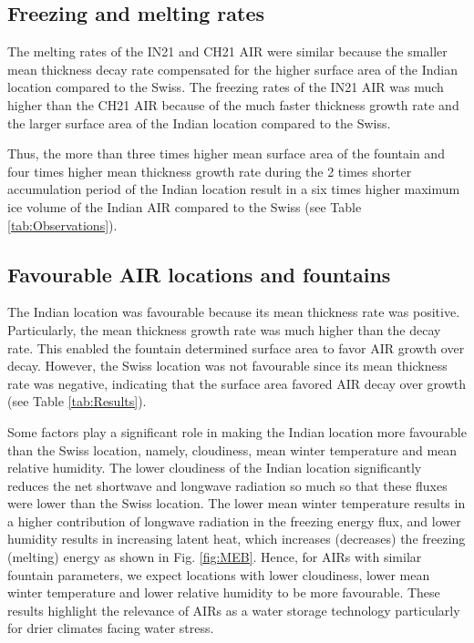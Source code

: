 \documentclass[utf8]{frontiersSCNS}
\begin{document}
\subsection{Freezing and melting rates}

The melting rates of the IN21 and CH21 AIR were similar because the smaller mean thickness decay rate
compensated for the higher surface area of the Indian location compared to the Swiss. The freezing rates of the
IN21 AIR was much higher than the CH21 AIR because of the much faster thickness growth rate and the larger
surface area of the Indian location compared to the Swiss.

Thus, the more than three times higher mean surface area of the fountain and four times higher mean thickness
growth rate during the 2 times shorter accumulation period of the Indian location result in a six times
higher maximum ice volume of the Indian AIR compared to the Swiss (see Table \ref{tab:Observations}).

\subsection{Favourable AIR locations and fountains}

The Indian location was favourable because its mean thickness rate was positive. Particularly, the mean
thickness growth rate was much higher than the decay rate. This enabled the fountain determined surface area to
favor AIR growth over decay. However, the Swiss location was not favourable since its mean thickness rate was
negative, indicating that the surface area favored AIR decay over growth (see Table \ref{tab:Results}).

Some factors play a significant role in making the Indian location more favourable than the Swiss location,
namely, cloudiness, mean winter temperature and mean relative humidity. The lower cloudiness of the Indian
location significantly reduces the net shortwave and longwave radiation so much so that these fluxes were
lower than the Swiss location. The lower mean winter temperature results in a higher contribution of longwave
radiation in the freezing energy flux, and lower humidity results in increasing latent heat, which increases
(decreases) the freezing (melting) energy as shown in Fig. \ref{fig:MEB}. Hence, for AIRs with similar
fountain parameters, we expect locations with lower cloudiness, lower mean winter temperature and lower relative
humidity to be more favourable. These results highlight the relevance of AIRs as a water storage technology
particularly for drier climates facing water stress.
\end{document}
